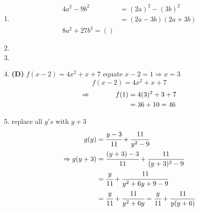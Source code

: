 \begin{multicols}{2}
\begin{enumerate}[label={\textbf{\arabic*.}}]
    \item 
    \begin{align*}
        4a^2 - 9b^2 &= (2a)^2 - (3b)^2 \\ &= (2a - 3b)(2a+3b) \\
        8a^2 + 27b^3 = ()
    \end{align*}
    \item
    \item
    \item \textbf{(D)} $f(x - 2) = 4x^2 + x + 7 $ equate $x - 2 = 1 \Rightarrow x = 3$ \\
    $$f(x - 2) = 4x^2 + x + 7$$
    \begin{align*} 
         \Rightarrow \hspace{.5in} f(1) &= 4(3)^2 + 3 + 7 \\
        & = 36 + 10 = 46
    \end{align*}

    \item replace all $y's \text { with } y + 3  $ 
    \begin{align*} 
        g(y) &= \cfrac{y - 3}{11} + \cfrac{11}{y^2 - 9} \\
       \Rightarrow  g(y + 3) &= \cfrac{(y + 3) - 3}{11} + \cfrac{11}{(y + 3)^2 - 9}  \\
        & = \cfrac{y}{11} + \cfrac{11}{y^2 + 6y + 9 -9} \\
        & = \cfrac{y}{11} + \cfrac{11}{y^2 + 6y} = \cfrac{y}{11} + \cfrac{11}{y (y + 6 ) }
    \end {align*}



\end{enumerate}
\end{multicols}
